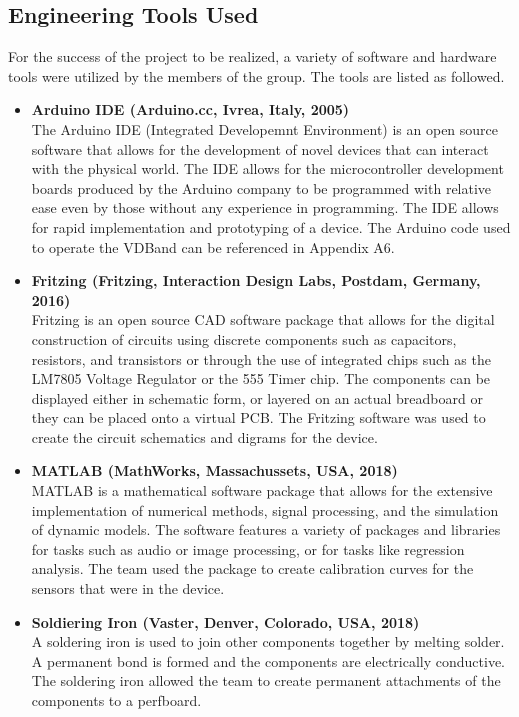\documentclass[11.5pt]{article}
\begin{document}
\subsection{Engineering Tools Used}
For the success of the project to be realized, a variety of software and hardware tools were utilized by the members of the group. The tools are listed as followed. 
\begin{itemize}
\item  \textbf{Arduino IDE (Arduino.cc, Ivrea, Italy, 2005)}\\
The Arduino IDE (Integrated Developemnt Environment) is an open source software that allows for the development of novel devices that can interact with the physical world. The IDE allows for the microcontroller development boards produced by the Arduino company to be programmed with relative ease even by those without any experience in programming. The IDE allows for rapid implementation and prototyping of a device. The Arduino code used to operate the VDBand can be referenced in Appendix A6. 

\item \textbf{Fritzing (Fritzing, Interaction Design Labs, Postdam, Germany, 2016)}\\
Fritzing is an open source CAD software package that allows for the digital construction of circuits using discrete components such as capacitors, resistors, and transistors or through the use of integrated chips such as the LM7805 Voltage Regulator or the 555 Timer chip. The components can be displayed either in schematic form, or layered on an actual breadboard or they can be placed onto a virtual PCB. The Fritzing software was used to create the circuit schematics and digrams for the device. 

\item \textbf{MATLAB (MathWorks, Massachussets, USA, 2018)}\\
MATLAB is a mathematical software package that allows for the extensive implementation of numerical methods, signal processing, and the simulation of dynamic models. The software features a variety of packages and libraries for tasks such as audio or image processing, or for tasks like regression analysis. The team used the package to create calibration curves for the sensors that were in the device.

\item \textbf{Soldiering Iron (Vaster, Denver, Colorado, USA, 2018)}\\
A soldering iron is used to join other components together by melting solder. A permanent bond is formed and the components are electrically conductive. The soldering iron allowed the team to create permanent attachments of the components to a perfboard. 


\end{itemize}
\end{document}
